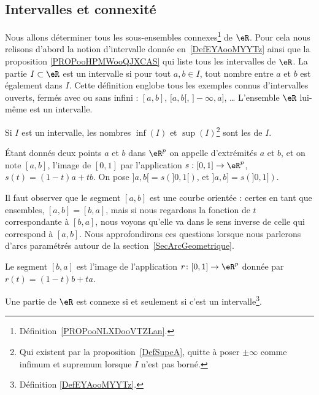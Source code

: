 \subsection{Intervalles et connexité}

Nous allons déterminer tous les sous-ensembles connexes\footnote{Définition~\ref{PROPooNLXDooVTZLan}.} de \( \eR\). Pour cela nous relisons d'abord la notion d'intervalle donnée en~\ref{DefEYAooMYYTz} ainsi que la proposition \ref{PROPooHPMWooQJXCAS} qui liste tous les intervalles de \( \eR\). La partie \( I\subset \eR\) est un intervalle si pour tout \( a,b\in I\), tout nombre entre \( a\) et \( b\) est également dans \( I\). Cette définition englobe tous les exemples connus d'intervalles ouverts, fermés avec ou sans infini : \( [a,b]\), \( [a,b[\), \( ]-\infty,a]\), \ldots{} L'ensemble \( \eR\) lui-même est un intervalle.

Si \( I\) est un intervalle, les nombres \( \inf(I)\) et \( \sup(I)\)\footnote{Qui existent par la proposition~\ref{DefSupeA}, quitte à poser \( \pm\infty\) comme infimum et supremum lorsque \( I\) n'est pas borné.} sont les  de \( I\).

\begin{definition}      \label{DefLISOooDHLQrl}
	Étant donnés deux points \( a\) et \( b\) dans \( \eR^p\) on appelle  d'extrémités \( a\) et \( b\), et on note \( [a,b]\), l'image de \( [0,1]\) par l'application \( s: [0,1]\to \eR^p\), \( s(t)= (1-t)a+tb\).  On pose \( ]a,b[=s\left(]0,1[\right)\), et  \( ]a,b]=s\left(]0,1]\right)\).
\end{definition}
Il faut observer que le segment \( [a,b]\) est une courbe orientée : certes en tant que ensembles, \( [a,b]=[b,a]\), mais si nous regardons la fonction de \( t\) correspondante à \( [b,a]\), nous voyons qu'elle va dans le sens inverse de celle qui correspond à \( [a,b]\). Nous approfondirons ces questions lorsque nous parlerons d'arcs paramétrés autour de la section~\ref{SecArcGeometrique}.

Le segment \( [b,a]\) est l'image de l'application \( r\colon [0,1]\to \eR^p\) donnée par \( r(t)=(1-t)b+ta\).

\begin{proposition} \label{PropInterssiConn}
	Une partie de \( \eR\) est connexe si et seulement si c'est un intervalle\footnote{Définition \ref{DefEYAooMYYTz}.}.
\end{proposition}

